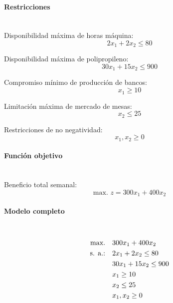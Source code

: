 \paragraph{Restricciones}\mbox{}\\

Disponibilidad máxima de horas máquina:
\begin{equation}
    2x_1 + 2x_2 \leq 80
\end{equation}

Disponibilidad máxima de polipropileno:
\begin{equation}
    30x_1 + 15x_2 \leq 900
\end{equation}

Compromiso mínimo de producción de bancos:
\begin{equation}
    x_1 \geq 10
\end{equation}

Limitación máxima de mercado de mesas:
\begin{equation}
    x_2 \leq 25
\end{equation}

Restricciones de no negatividad:
\begin{equation}
    x_1, x_2 \geq 0
\end{equation}

\paragraph{Función objetivo}\mbox{}\\
Beneficio total semanal:
\begin{equation}
    \mbox{max. } z = 300x_1 + 400x_2
\end{equation}

\paragraph{Modelo completo}\mbox{}\\
\begin{align}
\mbox{max.} \quad & 300x_1 + 400x_2 \notag \\
\mbox{s. a.:} \quad & 2x_1 + 2x_2 \leq 80 \notag \\
             & 30x_1 + 15x_2 \leq 900 \notag \\
             & x_1 \geq 10 \notag \\
             & x_2 \leq 25 \notag \\
             & x_1, x_2 \geq 0
\end{align}

